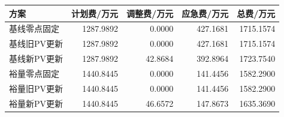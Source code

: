 \begin{tabular}{lrrrr}
\toprule
方案 & 计划费/万元 & 调整费/万元 & 应急费/万元 & 总费/万元 \\
\midrule
基线零点固定 & 1287.9892 & 0.0000 & 427.1681 & 1715.1574 \\
基线旧PV更新 & 1287.9892 & 0.0000 & 427.1681 & 1715.1574 \\
基线新PV更新 & 1287.9892 & 42.8684 & 392.8964 & 1723.7540 \\
裕量零点固定 & 1440.8445 & 0.0000 & 141.4456 & 1582.2900 \\
裕量旧PV更新 & 1440.8445 & 0.0000 & 141.4456 & 1582.2900 \\
裕量新PV更新 & 1440.8445 & 46.6572 & 147.8673 & 1635.3690 \\
\bottomrule
\end{tabular}
